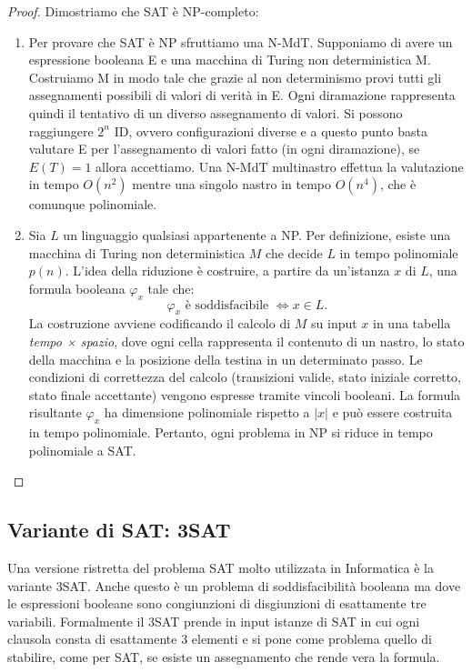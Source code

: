 \begin{proof}
Dimostriamo che SAT è NP-completo: 
    \begin{enumerate}
        \item Per provare che SAT è NP sfruttiamo una N-MdT. Supponiamo di avere un espressione booleana E e una macchina di Turing non deterministica M. Costruiamo M in modo tale che grazie al non determinismo provi tutti gli assegnamenti possibili di valori di verità in E. Ogni diramazione rappresenta quindi il tentativo di un diverso assegnamento di valori. Si possono raggiungere $2^n$ ID, ovvero configurazioni diverse e a questo punto basta valutare E per l'assegnamento di valori fatto (in ogni diramazione), se $E(T)=1$ allora accettiamo. Una N-MdT multinastro effettua la valutazione in tempo $O(n^2)$ mentre una singolo nastro in tempo $O(n^4)$, che è comunque polinomiale. 
        \item Sia $L$ un linguaggio qualsiasi appartenente a NP. Per definizione, esiste una macchina di Turing non deterministica $M$ che decide $L$ in tempo polinomiale $p(n)$. L'idea della riduzione è costruire, a partire da un'istanza $x$ di $L$, una formula booleana $\varphi_x$ tale che:\[\varphi_x \text{ è soddisfacibile } \iff x \in L.\] La costruzione avviene codificando il calcolo di $M$ su input $x$ in una tabella \textit{tempo × spazio}, dove ogni cella rappresenta il contenuto di un nastro, lo stato della macchina e la posizione della testina in un determinato passo. Le condizioni di correttezza del calcolo (transizioni valide, stato iniziale corretto, stato finale accettante) vengono espresse tramite vincoli booleani. La formula risultante $\varphi_x$ ha dimensione polinomiale rispetto a $|x|$ e può essere costruita in tempo polinomiale. Pertanto, ogni problema in NP si riduce in tempo polinomiale a SAT. ~\cite{7}
    \end{enumerate}
\end{proof}

\subsection{Variante di SAT: 3SAT}
Una versione ristretta del problema SAT molto utilizzata in Informatica è la variante 3SAT. 
Anche questo è un problema di soddisfacibilità booleana ma dove le espressioni booleane sono congiunzioni di disgiunzioni di esattamente tre variabili. 
Formalmente il 3SAT prende in input istanze di SAT in cui ogni clausola consta di esattamente 3 elementi e si pone come problema quello di stabilire, come per SAT, se esiste un assegnamento che rende vera la formula. 


